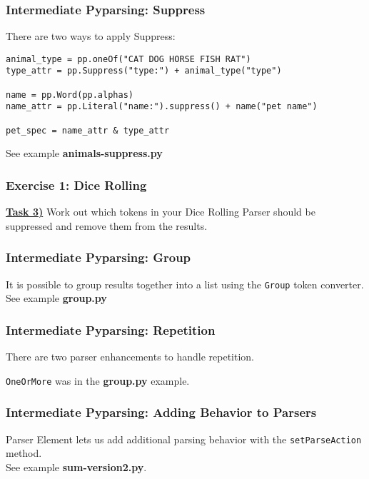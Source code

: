 \documentclass{beamer}
\begin{document}
\begin{frame}[fragile]
\frametitle{Intermediate Pyparsing: Suppress}
There are two ways to apply Suppress:
\begin{verbatim}
animal_type = pp.oneOf("CAT DOG HORSE FISH RAT")
type_attr = pp.Suppress("type:") + animal_type("type")

name = pp.Word(pp.alphas)
name_attr = pp.Literal("name:").suppress() + name("pet name")

pet_spec = name_attr & type_attr
\end{verbatim}
\medskip
See example \textbf{animals-suppress.py}
\end{frame}


\begin{frame}
\frametitle{Exercise 1: Dice Rolling}
\textbf{\underline{Task 3)}} Work out which tokens in your Dice Rolling Parser should be suppressed and remove them from the results. \\
\end{frame}


\begin{frame}
\frametitle{Intermediate Pyparsing: Group}
It is possible to group results together into a list using the \texttt{Group} token converter. \\
\bigskip
See example \textbf{group.py}
\end{frame}

\begin{frame}[fragile]
\frametitle{Intermediate Pyparsing: Repetition}
There are two parser enhancements to handle repetition. 
\begin{center}
\end{center}
\texttt{OneOrMore} was in the \textbf{group.py} example.
\end{frame}

\begin{frame}
\frametitle{Intermediate Pyparsing: Adding Behavior to Parsers}
Parser Element lets us add additional parsing behavior with the \texttt{setParseAction}  method. \\ 
\medskip
See example \textbf{sum-version2.py}.

\end{frame}
 
\end{document}
